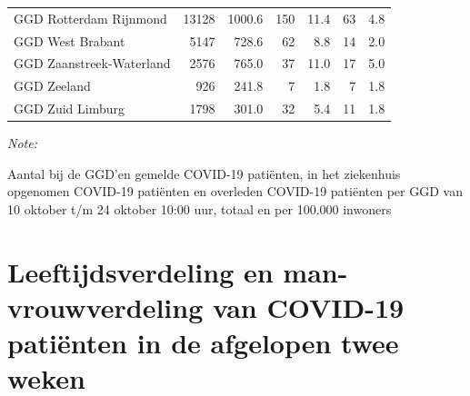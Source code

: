 \documentclass[
  english,
  man,floatsintext]{apa6}
\begin{document}
\begin{table}[H]
\begin{threeparttable}
\begin{tabular}{lrrrrrr}
GGD Rotterdam Rijnmond & 13128 & 1000.6 & 150 & 11.4 & 63 & 4.8\\
GGD West Brabant & 5147 & 728.6 & 62 & 8.8 & 14 & 2.0\\
GGD Zaanstreek-Waterland & 2576 & 765.0 & 37 & 11.0 & 17 & 5.0\\
GGD Zeeland & 926 & 241.8 & 7 & 1.8 & 7 & 1.8\\
GGD Zuid Limburg & 1798 & 301.0 & 32 & 5.4 & 11 & 1.8\\
\bottomrule
\end{tabular}
\begin{tablenotes}
\item \textit{Note: } 
\item Aantal bij de GGD’en gemelde COVID-19 patiënten, in het ziekenhuis opgenomen COVID-19 patiënten en overleden COVID-19 patiënten per GGD van 10 oktober t/m 24 oktober 10:00 uur, totaal en per 100.000 inwoners
\end{tablenotes}
\end{threeparttable}
\endgroup{}
\end{table}

\newpage

\hypertarget{leeftijdsverdeling-en-man-vrouwverdeling-van-covid-19-patiuxebnten-in-de-afgelopen-twee-weken}{%
\section{Leeftijdsverdeling en man-vrouwverdeling van COVID-19 patiënten in de afgelopen twee weken}\label{leeftijdsverdeling-en-man-vrouwverdeling-van-covid-19-patiuxebnten-in-de-afgelopen-twee-weken}}
\end{document}
